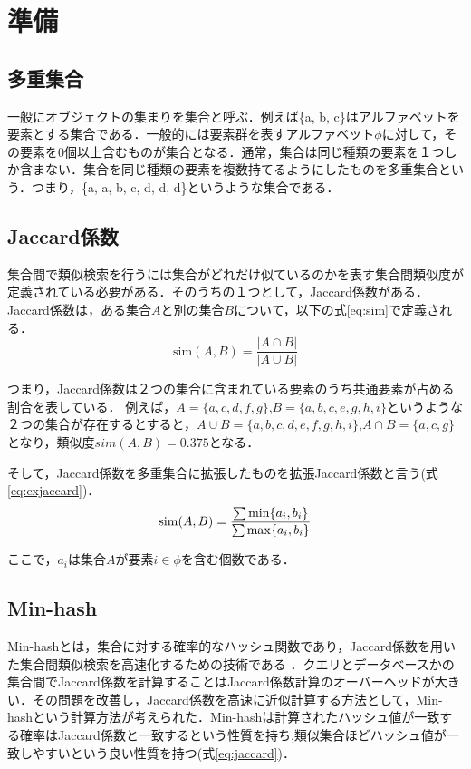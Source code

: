 \chapter{準備}
\section{多重集合}
一般にオブジェクトの集まりを集合と呼ぶ．例えば\{a, b, c\}はアルファベットを要素とする集合である．一般的には要素群を表すアルファベット$\phi$に対して，その要素を0個以上含むものが集合となる．通常，集合は同じ種類の要素を１つしか含まない．集合を同じ種類の要素を複数持てるようにしたものを多重集合という．つまり，\{a, a, b, c, d, d, d\}というような集合である．


\section{Jaccard係数}
集合間で類似検索を行うには集合がどれだけ似ているのかを表す集合間類似度が定義されている必要がある．そのうちの１つとして，Jaccard係数がある．
Jaccard係数は，ある集合$A$と別の集合$B$について，以下の式\ref{eq:sim}で定義される．
\begin{equation}
\label{eq:sim}
\mathrm{sim}(A,B)=  \frac {|A \cap {B} |} {|A \cup {B}| }
\end{equation}

つまり，Jaccard係数は２つの集合に含まれている要素のうち共通要素が占める割合を表している．
例えば，$A=\{a,c,d,f,g\}$,$B=\{a,b,c,e,g,h,i\}$というような２つの集合が存在するとすると，${A \cup {B} }=\{a,b,c,d,e,f,g,h,i\}$,$ {A \cap {B} }=\{a,c,g\}$となり，類似度$sim(A,B)=0.375$となる．

そして，Jaccard係数を多重集合に拡張したものを拡張Jaccard係数と言う(式 \ref{eq:exjaccard})．
\begin{equation}
\label{eq:exjaccard}
\mathrm{sim}(A,B)=  \frac {\sum{\mathrm{min}\{a_i,b_i\}}} {\sum{\mathrm{max}\{a_i,b_i\}} }\\
\end{equation}

ここで，$a_i$は集合$A$が要素$i∈\phi$を含む個数である．

\section{Min-hash}
Min-hashとは，集合に対する確率的なハッシュ関数であり，Jaccard係数を用いた集合間類似検索を高速化するための技術である \cite{Minhash}．クエリとデータベースかの集合間でJaccard係数を計算することはJaccard係数計算のオーバーヘッドが大きい．その問題を改善し，Jaccard係数を高速に近似計算する方法として，Min-hashという計算方法が考えられた．Min-hashは計算されたハッシュ値が一致する確率はJaccard係数と一致するという性質を持ち,類似集合ほどハッシュ値が一致しやすいという良い性質を持つ(式\ref{eq:jaccard})．

